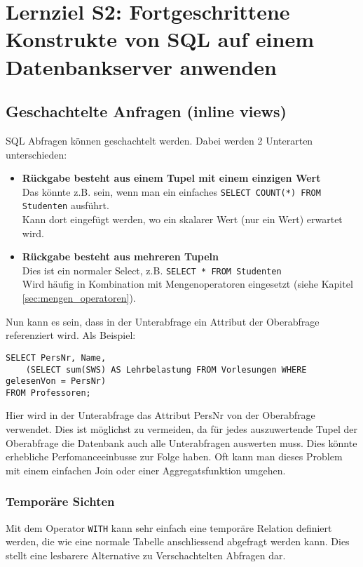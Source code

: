 \section{Lernziel S2: Fortgeschrittene Konstrukte von SQL auf einem Datenbankserver anwenden}

\subsection{Geschachtelte Anfragen (inline views)}

SQL Abfragen können geschachtelt werden. Dabei werden 2 Unterarten unterschieden:

\begin{itemize}
  \item \textbf{Rückgabe besteht aus einem Tupel mit einem einzigen Wert} \\
  Das könnte z.B. sein, wenn man ein einfaches \texttt{SELECT COUNT(*) FROM Studenten} ausführt. \\
  Kann dort eingefügt werden, wo ein skalarer Wert (nur ein Wert) erwartet wird.
  \item \textbf{Rückgabe besteht aus mehreren Tupeln} \\
  Dies ist ein normaler Select, z.B. \texttt{SELECT * FROM Studenten} \\
  Wird häufig in Kombination mit Mengenoperatoren eingesetzt (siehe Kapitel \ref{sec:mengen_operatoren}).
\end{itemize}

Nun kann es sein, dass in der Unterabfrage ein Attribut der Oberabfrage referenziert wird. Als Beispiel:

\begin{lstlisting}[caption={Korrelierte Unterabfrage},label=lst:unterabfrage_korreliert]
SELECT PersNr, Name,
	(SELECT sum(SWS) AS Lehrbelastung FROM Vorlesungen WHERE gelesenVon = PersNr)
FROM Professoren;
\end{lstlisting}

Hier wird in der Unterabfrage das Attribut PersNr von der Oberabfrage verwendet. Dies ist möglichst zu vermeiden, da für jedes auszuwertende Tupel der Oberabfrage die Datenbank auch alle Unterabfragen auswerten muss. Dies könnte erhebliche Perfomanceeinbusse zur Folge haben. Oft kann man dieses Problem mit einem einfachen Join oder einer Aggregatsfunktion umgehen.

\subsubsection{Temporäre Sichten}
Mit dem Operator \texttt{WITH} kann sehr einfach eine temporäre Relation definiert werden, die wie eine normale Tabelle anschliessend abgefragt werden kann. Dies stellt eine lesbarere Alternative zu Verschachtelten Abfragen dar.

